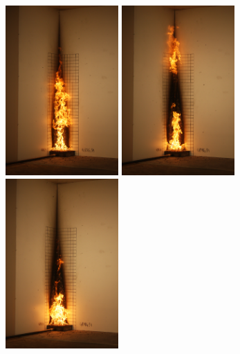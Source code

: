 \documentclass[twoside]{uocthesis}
\begin{document}
{\begin{figure}[p]
	\includegraphics[width=1.7in]{../Figures/GBNG34_SequenceIMG_0990}
	\includegraphics[width=1.7in]{../Figures/GBNG34_SequenceIMG_0991}
	\includegraphics[width=1.7in]{../Figures/GBNG34_SequenceIMG_0992} \\


\end{figure}}
\end{document}
